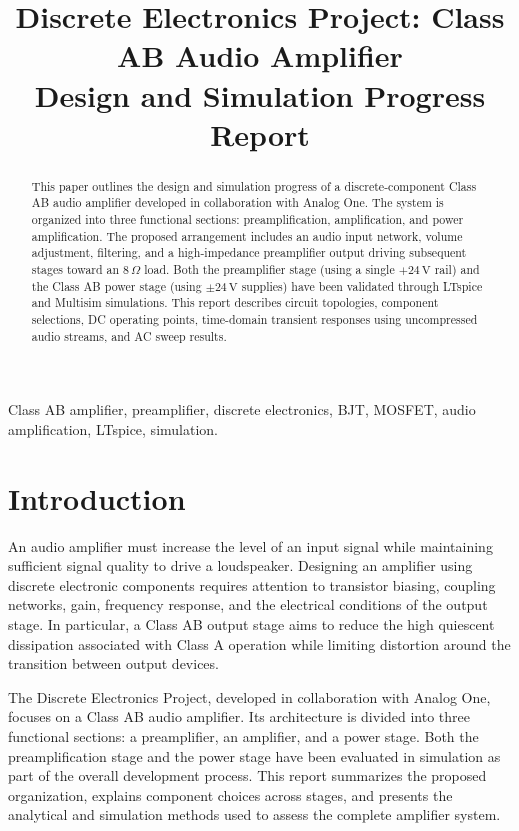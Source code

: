 \documentclass[conference]{IEEEtran}
\title{Discrete Electronics Project: Class AB Audio Amplifier\\\large Design and Simulation Progress Report}
\author{
\IEEEauthorblockN{
María Fernanda Morales Calderón,
Ian José Álvarez Arrieta,\\
Oscar Felipe Montejo Cordero,
Bryan Alessandro Elizondo Fallas,
Andrés Obregón López
}
\IEEEauthorblockA{
School of Electronics Engineering\\
Tecnológico de Costa Rica (TEC)
}
}
\begin{document}
\maketitle

\setlength{\parskip}{\baselineskip}
\setlength{\parindent}{0pt}

\begin{abstract}
This paper outlines the design and simulation progress of a discrete-component Class AB audio amplifier developed in collaboration with Analog One. The system is organized into three functional sections: preamplification, amplification, and power amplification. The proposed arrangement includes an audio input network, volume adjustment, filtering, and a high-impedance preamplifier output driving subsequent stages toward an $8\,\Omega$ load. Both the preamplifier stage (using a single $+24\,\mathrm{V}$ rail) and the Class AB power stage (using $\pm24\,\mathrm{V}$ supplies) have been validated through LTspice and Multisim simulations. This report describes circuit topologies, component selections, DC operating points, time-domain transient responses using uncompressed audio streams, and AC sweep results.
\end{abstract}

\begin{IEEEkeywords}
Class AB amplifier, preamplifier, discrete electronics, BJT, MOSFET, audio amplification, LTspice, simulation.
\end{IEEEkeywords}

\section{Introduction}
An audio amplifier must increase the level of an input signal while maintaining sufficient signal quality to drive a loudspeaker. Designing an amplifier using discrete electronic components requires attention to transistor biasing, coupling networks, gain, frequency response, and the electrical conditions of the output stage. In particular, a Class AB output stage aims to reduce the high quiescent dissipation associated with Class A operation while limiting distortion around the transition between output devices.

The Discrete Electronics Project, developed in collaboration with Analog One, focuses on a Class AB audio amplifier. Its architecture is divided into three functional sections: a preamplifier, an amplifier, and a power stage. Both the preamplification stage and the power stage have been evaluated in simulation as part of the overall development process. This report summarizes the proposed organization, explains component choices across stages, and presents the analytical and simulation methods used to assess the complete amplifier system.
\end{document}
